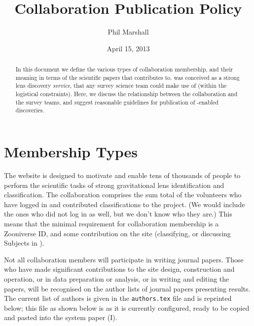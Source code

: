 \documentclass[a4paper]{article}
\begin{document}
             
\title{\SW Collaboration Publication Policy}
\author{Phil Marshall}
\date{April 15, 2013}
\maketitle


\begin{abstract} 
\noindent In this document we define the various types of \sw
collaboration membership, and their meaning in terms of the scientific
papers that \sw contributes to. \sw was conceived as a strong  lens
discovery {\it service}, that any survey science team could make use of
(within the logistical constraints). Here, we discuss the relationship
between the \sw collaboration and the survey teams, and suggest
reasonable guidelines for publication of \sw-enabled discoveries.
\end{abstract}

\setcounter{footnote}{1}


\section{Membership Types}
\label{sec:members}

The \sw website is designed to motivate and  enable tens of thousands of
people to perform the scientific tasks of strong gravitational lens
identification and classification.  The \sw collaboration comprises the
sum total of the volunteers who have logged in and contributed
classifications to the project. (We would include the ones who did not
log in as well, but we don't know who they are.) This means that the
minimal requirement for \sw collaboration membership is a Zooniverse ID,
and some contribution on the site (\ie classifying, or discussing
Subjects in \Talk).

Not all collaboration members will participate in writing journal
papers. Those who have made significant contributions to the site
design, construction and operation, or in data preparation or analysis,
or in writing and editing the papers, will be recognised on the author
lists of journal papers presenting \sw results. The current list of \sw 
authors is given in the \texttt{authors.tex} file and is reprinted
below; this file as shown below is as it is currently configured, ready
to be copied and pasted into the system paper (\sw I).
\end{document}
